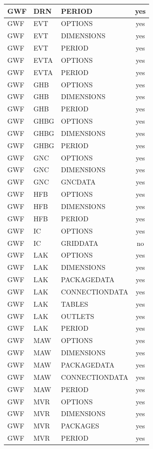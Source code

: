 \begin{longtable}{p{1.5cm} p{1.5cm} p{3cm} c}
GWF & DRN & PERIOD & yes \\ 
\hline
GWF & EVT & OPTIONS & yes \\ 
GWF & EVT & DIMENSIONS & yes \\ 
GWF & EVT & PERIOD & yes \\ 
\hline
GWF & EVTA & OPTIONS & yes \\ 
GWF & EVTA & PERIOD & yes \\ 
\hline
GWF & GHB & OPTIONS & yes \\ 
GWF & GHB & DIMENSIONS & yes \\ 
GWF & GHB & PERIOD & yes \\ 
\hline
GWF & GHBG & OPTIONS & yes \\ 
GWF & GHBG & DIMENSIONS & yes \\ 
GWF & GHBG & PERIOD & yes \\ 
\hline
GWF & GNC & OPTIONS & yes \\ 
GWF & GNC & DIMENSIONS & yes \\ 
GWF & GNC & GNCDATA & yes \\ 
\hline
GWF & HFB & OPTIONS & yes \\ 
GWF & HFB & DIMENSIONS & yes \\ 
GWF & HFB & PERIOD & yes \\ 
\hline
GWF & IC & OPTIONS & yes \\ 
GWF & IC & GRIDDATA & no \\ 
\hline
GWF & LAK & OPTIONS & yes \\ 
GWF & LAK & DIMENSIONS & yes \\ 
GWF & LAK & PACKAGEDATA & yes \\ 
GWF & LAK & CONNECTIONDATA & yes \\ 
GWF & LAK & TABLES & yes \\ 
GWF & LAK & OUTLETS & yes \\ 
GWF & LAK & PERIOD & yes \\ 
\hline
GWF & MAW & OPTIONS & yes \\ 
GWF & MAW & DIMENSIONS & yes \\ 
GWF & MAW & PACKAGEDATA & yes \\ 
GWF & MAW & CONNECTIONDATA & yes \\ 
GWF & MAW & PERIOD & yes \\ 
\hline
GWF & MVR & OPTIONS & yes \\ 
GWF & MVR & DIMENSIONS & yes \\ 
GWF & MVR & PACKAGES & yes \\ 
GWF & MVR & PERIOD & yes \\ 

\end{longtable}
